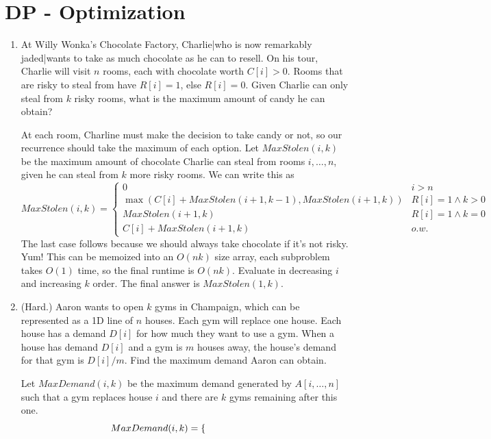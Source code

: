 \documentclass[fleqn]{article}
\begin{document}
\section{DP - Optimization}
\begin{enumerate}
    \item At Willy Wonka's Chocolate Factory, Charlie|who is now remarkably jaded|wants to take as much chocolate as he can to resell. On his tour, Charlie will visit $n$ rooms, each with chocolate worth $C[i]> 0$. Rooms that are risky to steal from have $R[i] = 1$, else $R[i] = 0$. Given Charlie can only steal from $k$ risky rooms, what is the maximum amount of candy he can obtain?
    \begin{answer}
        At each room, Charline must make the decision to take candy or not, so our recurrence should take the maximum of each option. Let $MaxStolen(i,k)$ be the maximum amount of chocolate Charlie can steal from rooms $i,\dots,n$, given he can steal from $k$ more risky rooms. We can write this as
        \[
            MaxStolen(i,k) = \begin{cases}
                0 & i > n \\
                \max(C[i] + MaxStolen(i+1,k-1), MaxStolen(i+1,k)) & R[i] = 1 \wedge k > 0 \\
                MaxStolen(i+1,k) & R[i] = 1 \wedge k = 0 \\
                C[i] + MaxStolen(i+1,k) & o.w.
            \end{cases}
        \]
        The last case follows because we should always take chocolate if it's not risky. Yum! This can be memoized into an $O(nk)$ size array, each subproblem takes $O(1)$ time, so the final runtime is $O(nk)$. Evaluate in decreasing $i$ and increasing $k$ order. The final answer is $MaxStolen(1,k)$.
    \end{answer}
    \item (Hard.) Aaron wants to open $k$ gyms in Champaign, which can be represented as a 1D line of $n$ houses. Each gym will replace one house. Each house has a demand $D[i]$ for how much they want to use a gym. When a house has demand $D[i]$ and a gym is $m$ houses away, the house's demand for that gym is $D[i]/m$. Find the maximum demand Aaron can obtain.
    \begin{answer}
        Let $MaxDemand(i,k)$ be the maximum demand generated by $A[i,\dots,n]$ such that a gym replaces house $i$ and there are $k$ gyms remaining after this one.
        \[
            \mkern-100mu MaxDemand(i,k) = \begin{cases}

\end{cases}\]
\end{answer}
\end{enumerate}
\end{document}
